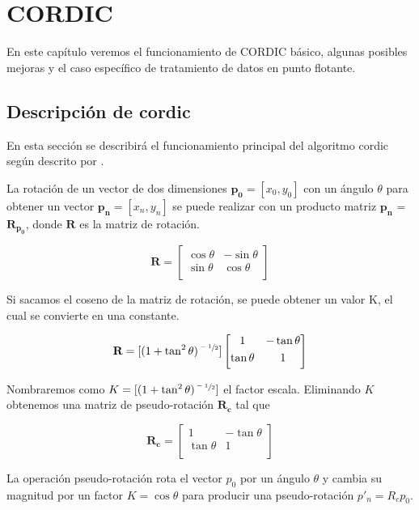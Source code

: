 \chapter{CORDIC}

En este capítulo veremos el funcionamiento de CORDIC básico, algunas posibles mejoras y el caso específico de tratamiento de datos en punto flotante.

\section{Descripción de \gls{cordic}}

En esta sección se describirá el funcionamiento principal del algoritmo \gls{cordic} según descrito por \cite{volder_cordic_1959}.

La rotación de un vector de dos dimensiones $\boldsymbol{p_{0}} = [x_{0},y_{0}]$ con un ángulo $\theta$ para obtener un vector $\boldsymbol{p_{n}} = [x_{n},y_{n}]$ se puede realizar con un producto matriz $\boldsymbol{p_{n}}$ = $\boldsymbol{R_{p_{0}}}$, donde $\textbf{R}$ es la matriz de rotación.

\[ \textbf{R} = \begin{bmatrix}
\cos{\theta} & -\sin{\theta} 	\\[0.3em]
\sin{\theta}  & \cos{\theta} 			\\[0.3em]
\end{bmatrix} \]

Si sacamos el coseno de la matriz de rotación, se puede obtener un valor K, el cual se convierte en una constante.

\[ \textbf{R} = [(1 + \tan^2{\theta})^{\sfrac{-1}{2}}] \begin{bmatrix}
1 & -\tan{\theta} 	\\[0.3em]
\tan{\theta}  & 1 			\\[0.3em]
\end{bmatrix} \]

Nombraremos como $K = [(1 + \tan^2{\theta})^{\sfrac{-1}{2}}]$ el factor escala. Eliminando $K$ obtenemos una matriz de pseudo-rotación $\boldsymbol{R_{c}}$ tal que

\[ \boldsymbol{R_{c}} = \begin{bmatrix}
1 & -\tan{\theta} 	\\[0.3em]
\tan{\theta}  & 1 			\\[0.3em]
\end{bmatrix} \]

La operación pseudo-rotación rota el vector $p_{0}$ por un ángulo $\theta$ y cambia su magnitud por un factor $K = \cos{\theta}$ para producir una pseudo-rotación $p'_n = R_c p_0$.

